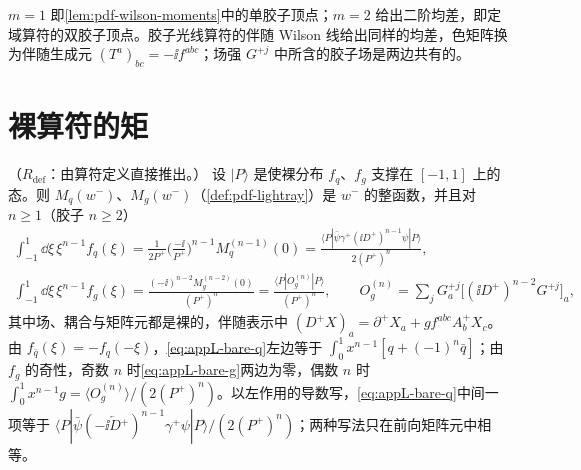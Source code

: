 $m=1$ 即\cref{lem:pdf-wilson-moments}中的单胶子顶点；$m=2$ 给出二阶均差，即定域算符的双胶子顶点。胶子光线算符的伴随 Wilson 线给出同样的均差，色矩阵换为伴随生成元 $(T^a)_{bc}=-\ii f^{abc}$；场强 $G^{+j}$ 中所含的胶子场是两边共有的。

\section{裸算符的矩}\label{sec:appL-bare}

\begin{proposition}\label{prop:appL-bare}
（$R_{\mathrm{def}}$：由算符定义直接推出。）
设 $|P\rangle$ 是使裸分布 $f_q$、$f_g$ 支撑在 $[-1,1]$ 上的态。则 $M_q(w^-)$、$M_g(w^-)$（\cref{def:pdf-lightray}）是 $w^-$ 的整函数，并且对 $n\ge1$（胶子 $n\ge2$）
\begin{gather}
\int_{-1}^1\dd\xi\,\xi^{n-1}f_q(\xi)=\frac{1}{2P^+}\Big(\frac{-\ii}{P^+}\Big)^{n-1}M_q^{(n-1)}(0)=\frac{\langle P|\bar\psi\gamma^+(\ii D^+)^{n-1}\psi|P\rangle}{2(P^+)^n},\label{eq:appL-bare-q}\\
\int_{-1}^1\dd\xi\,\xi^{n-1}f_g(\xi)=\frac{(-\ii)^{n-2}M_g^{(n-2)}(0)}{(P^+)^n}=\frac{\langle P|O^{(n)}_g|P\rangle}{(P^+)^n},\qquad O^{(n)}_g=\sum_jG^{+j}_a\big[(\ii D^+)^{n-2}G^{+j}\big]_a,\label{eq:appL-bare-g}
\end{gather}
其中场、耦合与矩阵元都是裸的，伴随表示中 $(D^+X)_a=\partial^+X_a+gf^{abc}A^+_bX_c$。由 $f_{\bar q}(\xi)=-f_q(-\xi)$，\cref{eq:appL-bare-q}左边等于 $\int_0^1x^{n-1}[q+(-1)^n\bar q]$；由 $f_g$ 的奇性，奇数 $n$ 时\cref{eq:appL-bare-g}两边为零，偶数 $n$ 时 $\int_0^1x^{n-1}g=\langle O^{(n)}_g\rangle/(2(P^+)^n)$。以左作用的导数写，\cref{eq:appL-bare-q}中间一项等于 $\langle P|\bar\psi(-\ii\overleftarrow{D}{}^+)^{n-1}\gamma^+\psi|P\rangle/(2(P^+)^n)$；两种写法只在前向矩阵元中相等。
\end{proposition}

